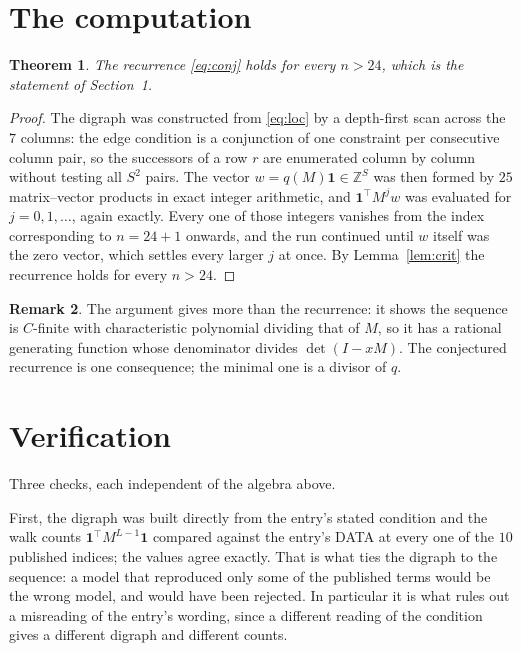 \documentclass[11pt,a4paper]{article}
\theoremstyle{plain}
\newtheorem{theorem}{Theorem}
\theoremstyle{definition}
\newtheorem{remark}[theorem]{Remark}
\begin{document}
\section{The computation}

\begin{theorem}
The recurrence \eqref{eq:conj} holds for every $n>24$, which is the statement of
Section~1.
\end{theorem}

\begin{proof}
The digraph was constructed from \eqref{eq:loc} by a depth-first scan across the $7$
columns: the edge condition is a conjunction of one constraint per consecutive column
pair, so the successors of a row $r$ are enumerated column by column without testing all
$S^2$ pairs. The vector $w=q(M)\mathbf{1}\in\mathbb{Z}^{S}$ was then formed by $25$
matrix--vector products in exact integer arithmetic, and $\mathbf{1}^{\!\top}M^{j}w$ was
evaluated for $j=0,1,\dots$, again exactly. Every one of those integers vanishes from the
index corresponding to $n=24+1$ onwards, and the run continued until $w$ itself was the
zero vector, which settles every larger $j$ at once. By Lemma~\ref{lem:crit} the recurrence
holds for every $n>24$.
\end{proof}

\begin{remark}
The argument gives more than the recurrence: it shows the sequence is $C$-finite with
characteristic polynomial dividing that of $M$, so it has a rational generating function
whose denominator divides $\det(I-xM)$. The conjectured recurrence is one consequence; the
minimal one is a divisor of $q$.
\end{remark}

\section{Verification}

Three checks, each independent of the algebra above.

First, the digraph was built directly from the entry's stated condition and the walk counts
$\mathbf{1}^{\!\top}M^{L-1}\mathbf{1}$ compared against the entry's DATA at
every one of the $10$ published indices; the values agree exactly. That is what ties
the digraph to the sequence: a model that reproduced only some of the published terms would
be the wrong model, and would have been rejected. In particular it is what rules out a
misreading of the entry's wording, since a different reading of the condition gives a
different digraph and different counts.
\end{document}
